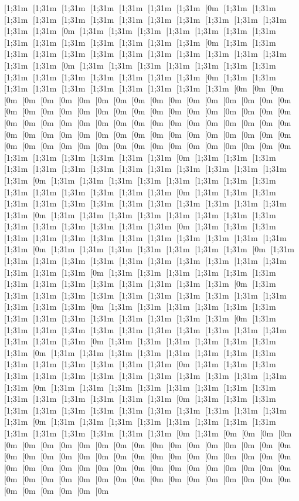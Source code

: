 [1;31m [1;31m [1;31m [1;31m [1;31m [1;31m [1;31m [0m [1;31m [1;31m [1;31m [1;31m [1;31m [1;31m [1;31m [1;31m [1;31m [1;31m [1;31m [1;31m [1;31m [1;31m [0m [1;31m [1;31m [1;31m [1;31m [1;31m [1;31m [1;31m [1;31m [1;31m [1;31m [1;31m [1;31m [1;31m [1;31m [0m [1;31m [1;31m [1;31m [1;31m [1;31m [1;31m [1;31m [1;31m [1;31m [1;31m [1;31m [1;31m [1;31m [1;31m [0m [1;31m [1;31m [1;31m [1;31m [1;31m [1;31m [1;31m [1;31m [1;31m [1;31m [1;31m [1;31m [1;31m [1;31m [0m [1;31m [1;31m [1;31m [1;31m [1;31m [1;31m [1;31m [1;31m [1;31m [1;31m [0m [0m [0m [0m [0m [0m [0m [0m [0m [0m [0m [0m [0m [0m [0m [0m [0m [0m [0m [0m [0m [0m [0m [0m [0m [0m [0m [0m [0m [0m [0m [0m [0m [0m [0m [0m [0m [0m [0m [0m [0m [0m [0m [0m [0m [0m [0m [0m [0m [0m [0m [0m [0m [0m [0m [0m [0m [0m [0m [0m [0m [0m [0m [0m [0m [0m [0m [0m [0m [0m [0m [0m [0m [0m [0m [0m [0m [0m [0m [0m [0m [0m [0m [1;31m [1;31m [1;31m [1;31m [1;31m [1;31m [0m [1;31m [1;31m [1;31m [1;31m [1;31m [1;31m [1;31m [1;31m [1;31m [1;31m [1;31m [1;31m [1;31m [1;31m [0m [1;31m [1;31m [1;31m [1;31m [1;31m [1;31m [1;31m [1;31m [1;31m [1;31m [1;31m [1;31m [1;31m [1;31m [0m [1;31m [1;31m [1;31m [1;31m [1;31m [1;31m [1;31m [1;31m [1;31m [1;31m [1;31m [1;31m [1;31m [1;31m [0m [1;31m [1;31m [1;31m [1;31m [1;31m [1;31m [1;31m [1;31m [1;31m [1;31m [1;31m [1;31m [1;31m [1;31m [0m [1;31m [1;31m [1;31m [1;31m [1;31m [1;31m [1;31m [1;31m [1;31m [1;31m [1;31m [1;31m [1;31m [1;31m [0m [1;31m [1;31m [1;31m [1;31m [1;31m [1;31m [1;31m [0m [1;31m [1;31m [1;31m [1;31m [1;31m [1;31m [1;31m [1;31m [1;31m [1;31m [1;31m [1;31m [1;31m [1;31m [0m [1;31m [1;31m [1;31m [1;31m [1;31m [1;31m [1;31m [1;31m [1;31m [1;31m [1;31m [1;31m [1;31m [1;31m [0m [1;31m [1;31m [1;31m [1;31m [1;31m [1;31m [1;31m [1;31m [1;31m [1;31m [1;31m [1;31m [1;31m [1;31m [0m [1;31m [1;31m [1;31m [1;31m [1;31m [1;31m [1;31m [1;31m [1;31m [1;31m [1;31m [1;31m [1;31m [1;31m [0m [1;31m [1;31m [1;31m [1;31m [1;31m [1;31m [1;31m [1;31m [1;31m [1;31m [1;31m [1;31m [1;31m [1;31m [0m [1;31m [1;31m [1;31m [1;31m [1;31m [1;31m [1;31m [0m [1;31m [1;31m [1;31m [1;31m [1;31m [1;31m [1;31m [1;31m [1;31m [1;31m [1;31m [1;31m [1;31m [1;31m [0m [1;31m [1;31m [1;31m [1;31m [1;31m [1;31m [1;31m [1;31m [1;31m [1;31m [1;31m [1;31m [1;31m [1;31m [0m [1;31m [1;31m [1;31m [1;31m [1;31m [1;31m [1;31m [1;31m [1;31m [1;31m [1;31m [1;31m [1;31m [1;31m [0m [1;31m [1;31m [1;31m [1;31m [1;31m [1;31m [1;31m [1;31m [1;31m [1;31m [1;31m [1;31m [1;31m [1;31m [0m [1;31m [1;31m [1;31m [1;31m [1;31m [1;31m [1;31m [1;31m [1;31m [1;31m [1;31m [1;31m [1;31m [1;31m [0m [1;31m [0m [0m [0m [0m [0m [0m [0m [0m [0m [0m [0m [0m [0m [0m [0m [0m [0m [0m [0m [0m [0m [0m [0m [0m [0m [0m [0m [0m [0m [0m [0m [0m [0m [0m [0m [0m [0m [0m [0m [0m [0m [0m [0m [0m [0m [0m [0m [0m [0m [0m [0m [0m [0m [0m [0m [0m [0m [0m [0m [0m [0m [0m [0m [0m [0m [0m [0m [0m [0m [0m [0m [0m [0m [0m 